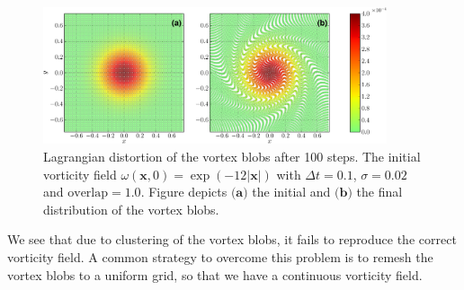 
	\begin{figure}[!b]
	\centering
	\includegraphics[width=0.9\textwidth]{figures/lagrangian/distortion-crop.pdf}
    \caption{Lagrangian distortion of the vortex blobs after 100 steps. The initial vorticity field $\omega\left(\mathbf{x},0\right) = \exp\left(-12\left|\mathbf{x}\right|\right)$ with $\Delta t = 0.1$, $\sigma=0.02$ and $\mathrm{overlap} = 1.0$. Figure depicts $\textbf{(a)}$ the initial and $\textbf{(b)}$ the final distribution of the vortex blobs.}
    \label{fig:distortion}
	\end{figure}


We see that due to clustering of the vortex blobs, it fails to reproduce the correct vorticity field. A common strategy to overcome this problem is to remesh the vortex blobs to a uniform grid, so that we have a continuous vorticity field.

